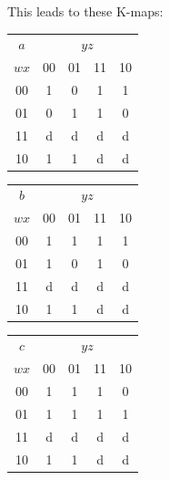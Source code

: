 \documentclass[10pt,a4paper]{scrartcl}
\begin{document}
This leads to these K-maps:\\
\begin{tabular}{|c||c|c|c|c|}
  \hline
 $a$     & \multicolumn{4}{c|}{$yz$} \\
  $wx$   & 00                 & 01                 & 11                 & 10                 \\ \hline\hline
  00     & \cellcolor{gray}1  &                 0  & \cellcolor{gray}1  & \cellcolor{gray}1  \\ \hline
  01     &                 0  & \cellcolor{gray}1  & \cellcolor{gray}1  &                 0  \\ \hline
  11     & \cellcolor{gray}d  & \cellcolor{gray}d  & \cellcolor{gray}d  & \cellcolor{gray}d  \\ \hline
  10     & \cellcolor{gray}1  & \cellcolor{gray}1  & \cellcolor{gray}d  & \cellcolor{gray}d  \\ \hline
\end{tabular}
\begin{tabular}{|c||c|c|c|c|}
  \hline
 $b$     & \multicolumn{4}{c|}{$yz$} \\
  $wx$   & 00                 & 01                 & 11                 & 10                 \\ \hline\hline
  00     & \cellcolor{gray}1  & \cellcolor{gray}1  & \cellcolor{gray}1  & \cellcolor{gray}1  \\ \hline
  01     & \cellcolor{gray}1  &                 0  & \cellcolor{gray}1  &                 0  \\ \hline
  11     & \cellcolor{gray}d  &                 d  & \cellcolor{gray}d  &                 d  \\ \hline
  10     & \cellcolor{gray}1  & \cellcolor{gray}1  & \cellcolor{gray}d  & \cellcolor{gray}d  \\ \hline
\end{tabular}
\begin{tabular}{|c||c|c|c|c|}
  \hline
 $c$     & \multicolumn{4}{c|}{$yz$} \\
  $wx$   & 00                 & 01                 & 11                 & 10                 \\ \hline\hline
  00     & \cellcolor{gray}1  & \cellcolor{gray}1  & \cellcolor{gray}1  &                 0  \\ \hline
  01     & \cellcolor{gray}1  & \cellcolor{gray}1  & \cellcolor{gray}1  & \cellcolor{gray}1  \\ \hline
  11     & \cellcolor{gray}d  & \cellcolor{gray}d  & \cellcolor{gray}d  & \cellcolor{gray}d  \\ \hline
  10     & \cellcolor{gray}1  & \cellcolor{gray}1  & \cellcolor{gray}d  &                 d  \\ \hline
\end{tabular}
\end{document}

